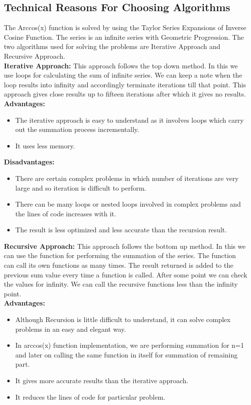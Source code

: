\documentclass[12pt]{article}
\begin{document}
\subsection{Technical Reasons For Choosing Algorithms}
The Arccos(x) function is solved by using the Taylor Series Expansions of Inverse Cosine Function. The series is an infinite series with Geometric Progression. The two algorithms used for solving the problems are Iterative Approach and Recursive Approach.\\
\newline
\textbf{Iterative Approach:} This approach follows the top down method. In this we use loops for calculating the sum of infinite series. We can keep a note when the loop results into infinity and accordingly terminate iterations till that point. This approach gives close results up to fifteen iterations after which it gives no results.\\
\newpage
\textbf{Advantages:}
\begin{itemize}
    \item The iterative approach is easy to understand as it involves loops which carry out the summation process incrementally.
    \item It uses less memory.
\end{itemize}

\textbf{Disadvantages:}
\begin{itemize}
    \item There are certain complex problems in which number of iterations are very large and so iteration is difficult to perform.
    \item There can be many loops or nested loops involved in complex problems and the lines of code increases with it.
    \item The result is less optimized and less accurate than the recursion result.
\end{itemize}
    
\noindent
\textbf{Recursive Approach:} This approach follows the bottom up method. In this we can use the function for performing the summation of the series. The function can call its own functions as many times. The result returned is added to the previous sum value every time a function is called. After some point we can check the values for infinity. We can call the recursive functions less than the infinity point.\\
\newline
\textbf{Advantages:}
\begin{itemize}
    \item Although Recursion is little difficult to understand, it can solve complex problems in an easy and elegant way.
    \item In arccos(x) function implementation, we are performing summation for n=1 and later on calling the same function in itself for summation of remaining part.
    \item It gives more accurate results than the iterative approach.
    \item It reduces the lines of code for particular problem.
\end{itemize}
\end{document}
